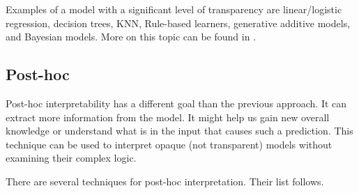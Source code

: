 Examples of a model with a significant level of transparency are linear/logistic regression, decision trees, KNN, Rule-based learners, generative additive models, and Bayesian models. More on this topic can be found in \cite{Arrieta2019}.

\subsection{Post-hoc}
Post-hoc interpretability has a different goal than the previous approach. It can extract more information from the model. It might help us gain new overall knowledge or understand what is in the input that causes such a prediction. This technique can be used to interpret opaque (not transparent) models without examining their complex logic.

There are several techniques for post-hoc interpretation. Their list follows.

